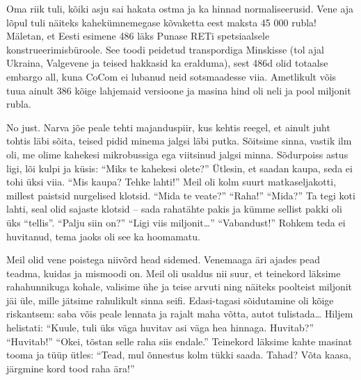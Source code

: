 
Oma riik tuli, kõiki asju sai hakata ostma ja ka hinnad normaliseerusid. Vene 
aja lõpul tuli näiteks kahekümnemegase kõvaketta eest
maksta 45 000 rubla! Mäletan, et Eesti esimene 486 läks Punase 
RETi spetsiaalsele konstrueerimisbüroole. See toodi peidetud transpordiga Minskisse (tol ajal Ukraina, Valgevene ja teised hakkasid ka 
eralduma), sest 486d olid totaalse embargo all, kuna 
CoCom ei lubanud neid sotsmaadesse 
viia. Ametlikult võis tuua ainult 386 kõige lahjemaid versioone ja masina hind oli neli ja pool miljonit rubla.


No just. Narva jõe peale tehti majanduspiir, kus kehtis reegel, et ainult juht tohtis läbi sõita, teised pidid minema jalgsi läbi putka. Sõitsime sinna, vastik 
ilm oli, me olime kahekesi mikrobussiga ega viitsinud jalgsi minna. Sõdurpoiss astus ligi, lõi kulpi ja küsis: \enquote{Miks te kahekesi 
olete?} Ütlesin, et saadan kaupa, seda ei tohi üksi viia. \enquote{Mis kaupa? 
Tehke lahti!} Meil oli kolm suurt matkaseljakotti, millest paistsid nurgelised 
klotsid. \enquote{Mida te veate?} \enquote{Raha!} \enquote{Mida?} Ta tegi
koti lahti, seal olid sajaste klotsid -- sada rahatähte pakis ja kümme sellist pakki oli üks \enquote{tellis}. \enquote{Palju 
siin on?} \enquote{Ligi viis miljonit\ldots}{ }\enquote{Vabandust!} Rohkem teda
ei huvitanud, tema jaoks oli see ka hoomamatu. 

Meil olid vene poistega niivõrd head sidemed. Venemaaga äri ajades pead 
teadma, kuidas ja mismoodi on. Meil oli usaldus nii suur, et teinekord läksime rahahunnikuga kohale, 
valisime ühe ja teise arvuti ning
näiteks poolteist miljonit jäi üle, mille jätsime rahulikult sinna 
seifi. Edasi-tagasi sõidutamine oli kõige riskantsem: saba võis
peale lennata ja rajalt maha võtta, autot tulistada\ldots{ }Hiljem 
helistati: \enquote{Kuule, tuli üks väga huvitav asi väga hea hinnaga. 
Huvitab?} \enquote{Huvitab!} \enquote{Okei, tõstan selle raha siis endale.} 
Teinekord läksime kahte masinat tooma ja tüüp ütles: \enquote{Tead, 
mul õnnestus kolm tükki saada. Tahad? Võta kaasa, järgmine kord tood raha 
ära!} 

